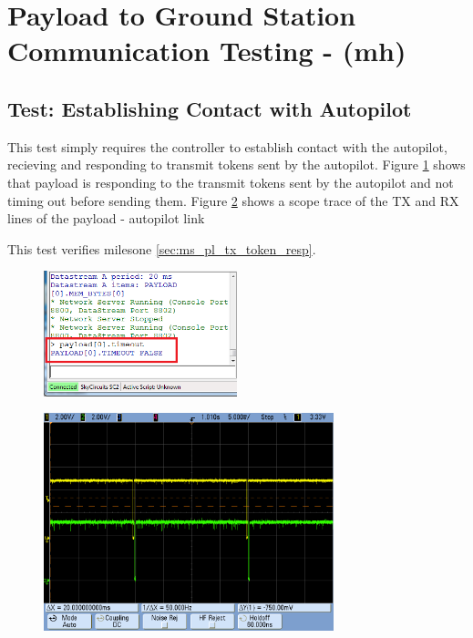 \section{Payload to Ground Station Communication Testing - (mh)}

\subsection{Test: Establishing Contact with Autopilot}
\label{sec:test_pl_est_contact}
This test simply requires the controller to establish contact with the autopilot, recieving and responding to
transmit tokens sent by the autopilot. Figure \ref{fig:pl_comms_timeout_false} shows that payload is responding
to the transmit tokens sent by the autopilot and not timing out before sending them. Figure \ref{fig:transmit_tokens_succ}
shows a scope trace of the TX and RX lines of the payload - autopilot link

This test verifies milesone \ref{sec:ms_pl_tx_token_resp}.

\begin{figure}[H]
        \centering
        \includegraphics[width=0.5\textwidth]{testing_screenshots/timeout_false.png}
        \label{fig:pl_comms_timeout_false}
\end{figure}


\begin{figure}[H]
        \centering
        \includegraphics[width=0.75\textwidth]{testing_screenshots/transmit_tokens_succ.png}
        \label{fig:transmit_tokens_succ}
\end{figure}

